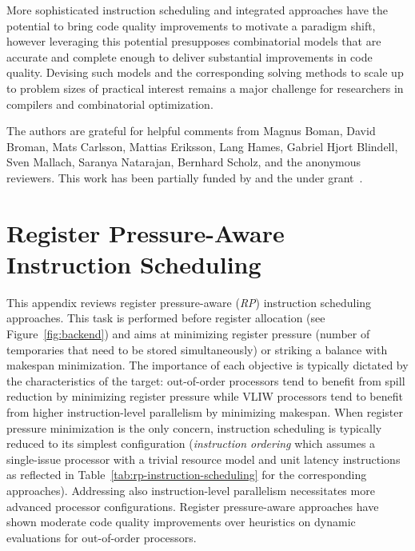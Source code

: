 \documentclass[acmsmall,authorversion,nonacm]{acmart}
\begin{document}
More sophisticated instruction scheduling and integrated approaches
have the potential to bring code quality improvements to motivate a
paradigm shift, however leveraging this potential presupposes
combinatorial models that are accurate and complete enough to deliver
substantial improvements in code quality.
Devising such models and the corresponding solving methods to scale up
to problem sizes of practical interest remains a major challenge for
researchers in compilers and combinatorial optimization.

\begin{acks}
The authors are grateful for helpful comments from Magnus Boman, David
Broman, Mats Carlsson, Mattias Eriksson, Lang Hames, Gabriel Hjort
Blindell, Sven Mallach, Saranya Natarajan, Bernhard Scholz, and the
anonymous reviewers.
This work has been partially funded by
 and
the  under grant~.
\end{acks}




\newpage

\appendix

\section{Register Pressure-Aware Instruction Scheduling}\label{app:rp-instruction-scheduling}

This appendix reviews register pressure-aware (\emph{RP}) instruction
scheduling approaches.
This task is performed before register allocation (see
Figure~\ref{fig:backend}) and aims at minimizing register pressure
(number of temporaries that need to be stored simultaneously) or
striking a balance with makespan minimization.
The importance of each objective is typically dictated by the
characteristics of the target: out-of-order processors tend to benefit
from spill reduction by minimizing register pressure while VLIW
processors tend to benefit from higher instruction-level parallelism
by minimizing makespan.
When register pressure minimization is the only concern, instruction
scheduling is typically reduced to its simplest configuration
(\emph{instruction ordering} which assumes a single-issue processor
with a trivial resource model and unit latency instructions as
reflected in Table~\ref{tab:rp-instruction-scheduling} for the
corresponding approaches).
Addressing also instruction-level parallelism necessitates more
advanced processor configurations.
Register pressure-aware approaches have shown moderate code quality
improvements over heuristics on dynamic evaluations for out-of-order
processors.
\end{document}
